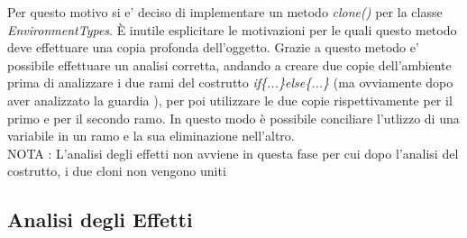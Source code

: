 \documentclass{article}
\begin{document}
\begin{itemize}
    Per questo motivo si e' deciso di implementare un metodo \textit{clone()} per la classe \textit{EnvironmentTypes}. È inutile esplicitare le motivazioni per le quali questo metodo deve effettuare una copia profonda dell'oggetto. Grazie a questo metodo e' possibile effettuare un analisi corretta, andando a creare due copie dell'ambiente prima di analizzare i due rami del costrutto \textit{if\{...\}else\{...\}} (ma ovviamente dopo aver analizzato la guardia ), per poi utilizzare le due copie rispettivamente per il primo e per il secondo ramo. In questo modo è possibile conciliare l'utlizzo di una variabile in un ramo e la sua eliminazione nell'altro.\\
    NOTA : L'analisi degli effetti non avviene in questa fase per cui dopo l'analisi del costrutto, i due cloni non vengono uniti
\end{itemize}

\subsection{Analisi degli Effetti}
\end{document}
